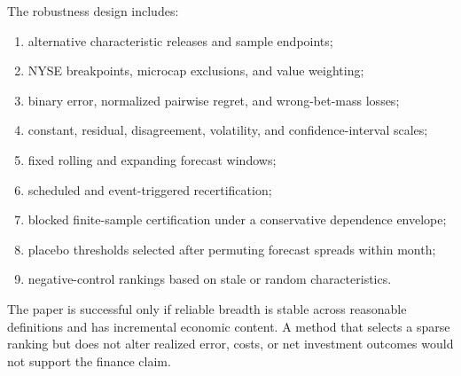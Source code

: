The robustness design includes:
\begin{enumerate}[leftmargin=2em]
\item alternative characteristic releases and sample endpoints;
\item NYSE breakpoints, microcap exclusions, and value weighting;
\item binary error, normalized pairwise regret, and wrong-bet-mass losses;
\item constant, residual, disagreement, volatility, and confidence-interval scales;
\item fixed rolling and expanding forecast windows;
\item scheduled and event-triggered recertification;
\item blocked finite-sample certification under a conservative dependence envelope;
\item placebo thresholds selected after permuting forecast spreads within month;
\item negative-control rankings based on stale or random characteristics.
\end{enumerate}

The paper is successful only if reliable breadth is stable across reasonable definitions and has incremental economic content. A method that selects a sparse ranking but does not alter realized error, costs, or net investment outcomes would not support the finance claim.
